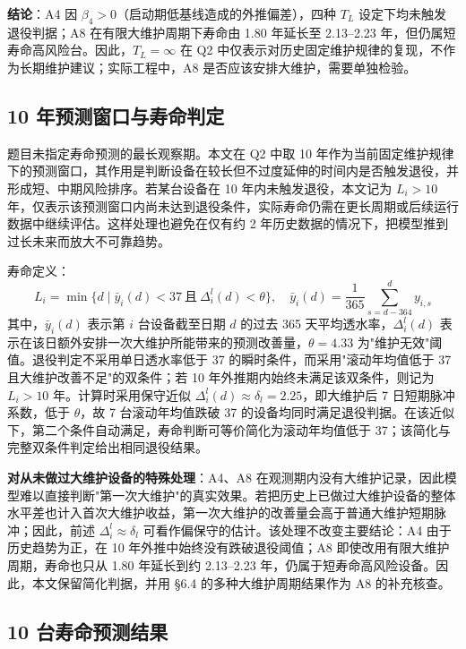 \documentclass[12pt, a4paper, fontset=fandol]{ctexart}
\theoremstyle{definition}
\begin{document}
\textbf{结论}：A4 因 $\beta_4 > 0$（启动期低基线造成的外推偏差），四种 $T_L$ 设定下均未触发退役判据；A8 在有限大维护周期下寿命由 1.80 年延长至 2.13--2.23 年，但仍属短寿命高风险台。因此，$T_L = \infty$ 在 Q2 中仅表示对历史固定维护规律的复现，不作为长期维护建议；实际工程中，A8 是否应该安排大维护，需要单独检验。

\subsection{10 年预测窗口与寿命判定}

题目未指定寿命预测的最长观察期。本文在 Q2 中取 10 年作为当前固定维护规律下的预测窗口，其作用是判断设备在较长但不过度延伸的时间内是否触发退役，并形成短、中期风险排序。若某台设备在 10 年内未触发退役，本文记为 $L_i>10$ 年，仅表示该预测窗口内尚未达到退役条件，实际寿命仍需在更长周期或后续运行数据中继续评估。这样处理也避免在仅有约 2 年历史数据的情况下，把模型推到过长未来而放大不可靠趋势。

寿命定义：
\[
L_i = \min\{d \mid \bar{y}_i(d) < 37 \ \text{且}\ \Delta_i^l(d) < \theta\}, \quad
\bar{y}_i(d) = \frac{1}{365}\sum_{s=d-364}^{d} y_{i,s}
\]
其中，$\bar{y}_i(d)$ 表示第 $i$ 台设备截至日期 $d$ 的过去 365 天平均透水率，$\Delta_i^l(d)$ 表示在该日额外安排一次大维护所能带来的预测改善量，$\theta=4.33$ 为"维护无效"阈值。退役判定不采用单日透水率低于 37 的瞬时条件，而采用"滚动年均值低于 37 且大维护改善不足"的双条件；若 10 年外推期内始终未满足该双条件，则记为 $L_i > 10$ 年。计算时采用保守近似 $\Delta_i^l(d)\approx \delta_l=2.25$，即大维护后 7 日短期脉冲系数，低于 $\theta$，故 7 台滚动年均值跌破 37 的设备均同时满足退役判据。在该近似下，第二个条件自动满足，寿命判断可等价简化为滚动年均值低于 37；该简化与完整双条件判定给出相同退役结果。

\noindent\textbf{对从未做过大维护设备的特殊处理}：A4、A8 在观测期内没有大维护记录，因此模型难以直接判断"第一次大维护"的真实效果。若把历史上已做过大维护设备的整体水平差也计入首次大维护收益，第一次大维护的改善量会高于普通大维护短期脉冲；因此，前述 $\Delta_i^l \approx \delta_l$ 可看作偏保守的估计。该处理不改变主要结论：A4 由于历史趋势为正，在 10 年外推中始终没有跌破退役阈值；A8 即使改用有限大维护周期，寿命也只从 1.80 年延长到约 2.13--2.23 年，仍属于短寿命高风险设备。因此，本文保留简化判据，并用 §6.4 的多种大维护周期结果作为 A8 的补充核查。

\subsection{10 台寿命预测结果}
\end{document}
